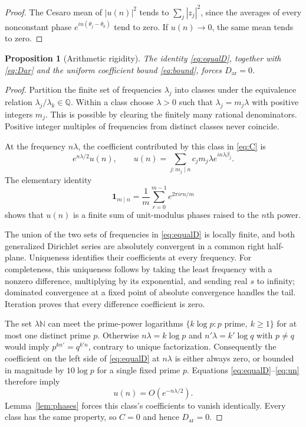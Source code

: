 \documentclass[11pt]{article}
\newtheorem{proposition}[theorem]{Proposition}
\theoremstyle{definition}
\theoremstyle{remark}
\newcommand{\Q}{\mathbb Q}
\newcommand{\N}{\mathbb N}
\newcommand{\one}{\mathbf 1}
\numberwithin{equation}{section}
\begin{document}
\begin{proof}
The Cesaro mean of $|u(n)|^2$ tends to $\sum_j|z_j|^2$, since the averages of every nonconstant phase $e^{in(\theta_j-\theta_k)}$ tend to zero. If $u(n)\to0$, the same mean tends to zero.
\end{proof}

\begin{proposition}[Arithmetic rigidity]\label{prop:rigidity}
The identity \eqref{eq:equalD}, together with \eqref{eq:Dar} and the uniform coefficient bound \eqref{eq:bound}, forces $D_{\mathrm{ar}}=0$.
\end{proposition}

\begin{proof}
Partition the finite set of frequencies $\lambda_j$ into classes under the equivalence relation $\lambda_j/\lambda_k\in\Q$. Within a class choose $\lambda>0$ such that $\lambda_j=m_j\lambda$ with positive integers $m_j$. This is possible by clearing the finitely many rational denominators. Positive integer multiples of frequencies from distinct classes never coincide.

At the frequency $n\lambda$, the coefficient contributed by this class in \eqref{eq:C} is
\begin{equation}\label{eq:un}
e^{n\lambda/2}u(n),\qquad
u(n)=\sum_{j:m_j\mid n}c_jm_j\lambda e^{in\lambda\beta_j}.
\end{equation}
The elementary identity
\[
\one_{m\mid n}=\frac1m\sum_{r=0}^{m-1}e^{2\pi irn/m}
\]
shows that $u(n)$ is a finite sum of unit-modulus phases raised to the $n$th power.

The union of the two sets of frequencies in \eqref{eq:equalD} is locally finite, and both generalized Dirichlet series are absolutely convergent in a common right half-plane. Uniqueness identifies their coefficients at every frequency. For completeness, this uniqueness follows by taking the least frequency with a nonzero difference, multiplying by its exponential, and sending real $s$ to infinity; dominated convergence at a fixed point of absolute convergence handles the tail. Iteration proves that every difference coefficient is zero.

The set $\lambda\N$ can meet the prime-power logarithms $\{k\log p:p\text{ prime},\ k\ge1\}$ for at most one distinct prime $p$. Otherwise $n\lambda=k\log p$ and $n'\lambda=k'\log q$ with $p\ne q$ would imply
$p^{kn'}=q^{k'n}$, contrary to unique factorization. Consequently the coefficient on the left side of \eqref{eq:equalD} at $n\lambda$ is either always zero, or bounded in magnitude by $10\log p$ for a single fixed prime $p$. Equations \eqref{eq:equalD}--\eqref{eq:un} therefore imply
\[
u(n)=O(e^{-n\lambda/2}).
\]
Lemma~\ref{lem:phases} forces this class's coefficients to vanish identically. Every class has the same property, so $C=0$ and hence $D_{\mathrm{ar}}=0$.
\end{proof}
\end{document}
